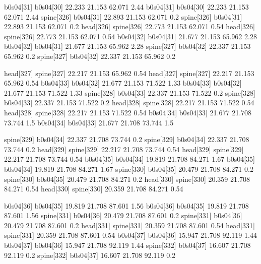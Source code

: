 b0s04[31]    b0s04[30]    22.233    21.153    62.071    2.44
b0s04[31]    b0s04[30]    22.233    21.153    62.071    2.44
spine[326]    b0s04[31]    22.893    21.153    62.071    0.2
spine[326]    b0s04[31]    22.893    21.153    62.071    0.2
head[326]    spine[326]    22.773    21.153    62.071    0.54
head[326]    spine[326]    22.773    21.153    62.071    0.54
b0s04[32]    b0s04[31]    21.677    21.153    65.962    2.28
b0s04[32]    b0s04[31]    21.677    21.153    65.962    2.28
spine[327]    b0s04[32]    22.337    21.153    65.962    0.2
spine[327]    b0s04[32]    22.337    21.153    65.962    0.2


head[327]    spine[327]    22.217    21.153    65.962    0.54
head[327]    spine[327]    22.217    21.153    65.962    0.54
b0s04[33]    b0s04[32]    21.677    21.153    71.522    1.33
b0s04[33]    b0s04[32]    21.677    21.153    71.522    1.33
spine[328]    b0s04[33]    22.337    21.153    71.522    0.2
spine[328]    b0s04[33]    22.337    21.153    71.522    0.2
head[328]    spine[328]    22.217    21.153    71.522    0.54
head[328]    spine[328]    22.217    21.153    71.522    0.54
b0s04[34]    b0s04[33]    21.677    21.708    73.744    1.5
b0s04[34]    b0s04[33]    21.677    21.708    73.744    1.5


spine[329]    b0s04[34]    22.337    21.708    73.744    0.2
spine[329]    b0s04[34]    22.337    21.708    73.744    0.2
head[329]    spine[329]    22.217    21.708    73.744    0.54
head[329]    spine[329]    22.217    21.708    73.744    0.54
b0s04[35]    b0s04[34]    19.819    21.708    84.271    1.67
b0s04[35]    b0s04[34]    19.819    21.708    84.271    1.67
spine[330]    b0s04[35]    20.479    21.708    84.271    0.2
spine[330]    b0s04[35]    20.479    21.708    84.271    0.2
head[330]    spine[330]    20.359    21.708    84.271    0.54
head[330]    spine[330]    20.359    21.708    84.271    0.54


b0s04[36]    b0s04[35]    19.819    21.708    87.601    1.56
b0s04[36]    b0s04[35]    19.819    21.708    87.601    1.56
spine[331]    b0s04[36]    20.479    21.708    87.601    0.2
spine[331]    b0s04[36]    20.479    21.708    87.601    0.2
head[331]    spine[331]    20.359    21.708    87.601    0.54
head[331]    spine[331]    20.359    21.708    87.601    0.54
b0s04[37]    b0s04[36]    15.947    21.708    92.119    1.44
b0s04[37]    b0s04[36]    15.947    21.708    92.119    1.44
spine[332]    b0s04[37]    16.607    21.708    92.119    0.2
spine[332]    b0s04[37]    16.607    21.708    92.119    0.2


